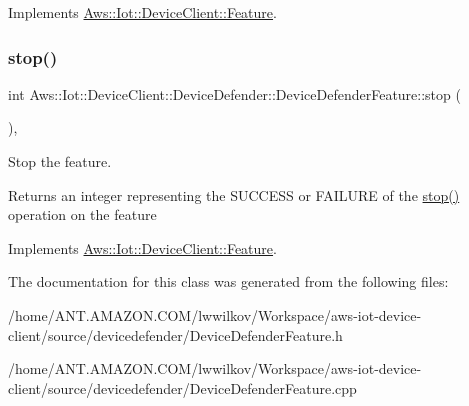 Implements \hyperlink{class_aws_1_1_iot_1_1_device_client_1_1_feature_ac9a936ebd88f7e35914a6aac99badf7d}{Aws\+::\+Iot\+::\+Device\+Client\+::\+Feature}.

\mbox{\label{class_aws_1_1_iot_1_1_device_client_1_1_device_defender_1_1_device_defender_feature_a93b78c0fe8518baabdff3d38544b9d00}} 
\subsubsection{\texorpdfstring{stop()}{stop()}}
{\footnotesize\ttfamily int Aws\+::\+Iot\+::\+Device\+Client\+::\+Device\+Defender\+::\+Device\+Defender\+Feature\+::stop (\begin{DoxyParamCaption}{ }\end{DoxyParamCaption})\hspace{0.3cm}{\ttfamily [override]}, {\ttfamily [virtual]}}



Stop the feature. 

\begin{DoxyReturn}{Returns}
an integer representing the S\+U\+C\+C\+E\+SS or F\+A\+I\+L\+U\+RE of the \hyperlink{class_aws_1_1_iot_1_1_device_client_1_1_device_defender_1_1_device_defender_feature_a93b78c0fe8518baabdff3d38544b9d00}{stop()} operation on the feature 
\end{DoxyReturn}


Implements \hyperlink{class_aws_1_1_iot_1_1_device_client_1_1_feature_a5b672f7b1403512cad9104ba923fc73d}{Aws\+::\+Iot\+::\+Device\+Client\+::\+Feature}.



The documentation for this class was generated from the following files\+:\begin{DoxyCompactItemize}
\item 
/home/\+A\+N\+T.\+A\+M\+A\+Z\+O\+N.\+C\+O\+M/lwwilkov/\+Workspace/aws-\/iot-\/device-\/client/source/devicedefender/Device\+Defender\+Feature.\+h\item 
/home/\+A\+N\+T.\+A\+M\+A\+Z\+O\+N.\+C\+O\+M/lwwilkov/\+Workspace/aws-\/iot-\/device-\/client/source/devicedefender/Device\+Defender\+Feature.\+cpp\end{DoxyCompactItemize}
